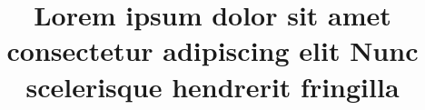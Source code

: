 \documentclass[12pt]{cspcccsthesis}
\title{Lorem ipsum dolor sit amet consectetur adipiscing elit Nunc scelerisque hendrerit fringilla}
\begin{document}

\begin{frontmatter}
    
    
    \makeAbstract
    \makeTOC
    \makeListOfTables
    \makeListOfFigures
\end{frontmatter}

\begin{thesisbody}
    
    
    
    
    
    \makeBibliography
    
    
\end{thesisbody}
\end{document}
